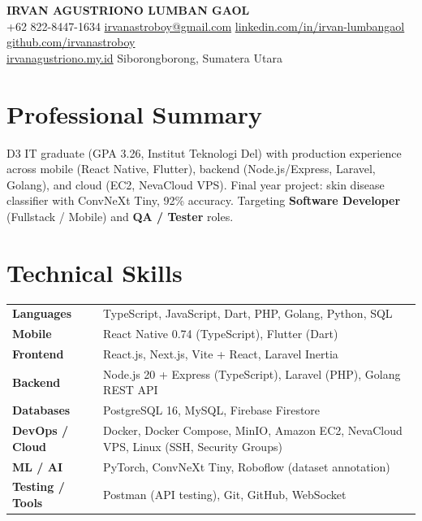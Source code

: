 \documentclass[9.5pt,a4paper]{article}
\begin{document}
\begin{center}
  {\LARGE\bfseries\color{navydark} IRVAN AGUSTRIONO LUMBAN GAOL}\\[4pt]
  \small
  +62 822-8447-1634 \enspace\textbar\enspace
  \href{mailto:irvanastroboy@gmail.com}{irvanastroboy@gmail.com} \enspace\textbar\enspace
  \href{https://www.linkedin.com/in/irvan-lumbangaol-9478372b4}{linkedin.com/in/irvan-lumbangaol} \enspace\textbar\enspace
  \href{https://github.com/irvanastroboy}{github.com/irvanastroboy}\\[2pt]
  \href{https://irvanagustriono.my.id}{irvanagustriono.my.id} \enspace\textbar\enspace
  Siborongborong, Sumatera Utara
\end{center}

\section{Professional Summary}

D3 IT graduate (GPA 3.26, Institut Teknologi Del) with production experience across mobile (React Native, Flutter), backend (Node.js/Express, Laravel, Golang), and cloud (EC2, NevaCloud VPS). Final year project: skin disease classifier with ConvNeXt Tiny, 92\% accuracy. Targeting \textbf{Software Developer} (Fullstack / Mobile) and \textbf{QA / Tester} roles.

\section{Technical Skills}

\renewcommand{\arraystretch}{1.05}
\begin{tabularx}{\linewidth}{@{} >{\bfseries}l X @{}}
  Languages       & TypeScript, JavaScript, Dart, PHP, Golang, Python, SQL \\
  Mobile          & React Native 0.74 (TypeScript), Flutter (Dart) \\
  Frontend        & React.js, Next.js, Vite + React, Laravel Inertia \\
  Backend         & Node.js 20 + Express (TypeScript), Laravel (PHP), Golang REST API \\
  Databases       & PostgreSQL 16, MySQL, Firebase Firestore \\
  DevOps / Cloud  & Docker, Docker Compose, MinIO, Amazon EC2, NevaCloud VPS, Linux (SSH, Security Groups) \\
  ML / AI         & PyTorch, ConvNeXt Tiny, Roboflow (dataset annotation) \\
  Testing / Tools & Postman (API testing), Git, GitHub, WebSocket \\
\end{tabularx}
\end{document}
